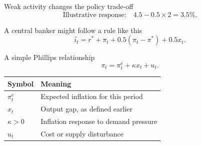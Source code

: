 \documentclass[12pt,aspectratio=169]{beamer}
\begin{document}

\begin{frame}{Weak activity changes the policy trade-off}
\[\text{Illustrative response:}\quad4.5-0.5\times2=3.5\%.\]
\end{frame}


\begin{frame}{A central banker might follow a rule like this}
\[\boxed{\bar i_t=r^*+\pi_t+0.5(\pi_t-\pi^*)+0.5x_t.}\]
\end{frame}


\begin{frame}{A simple Phillips relationship}
\[\pi_t=\pi_t^e+\kappa x_t+u_t.\]\begin{center}\begin{tabular}{@{}ll@{}}\toprule \textbf{Symbol} & \textbf{Meaning}\\\midrule $\pi_t^e$ & Expected inflation for this period\\[2mm]
$x_t$ & Output gap, as defined earlier\\[2mm]
$\kappa>0$ & Inflation response to demand pressure\\[2mm]
$u_t$ & Cost or supply disturbance\\\bottomrule\end{tabular}\end{center}
\end{frame}

\end{document}

